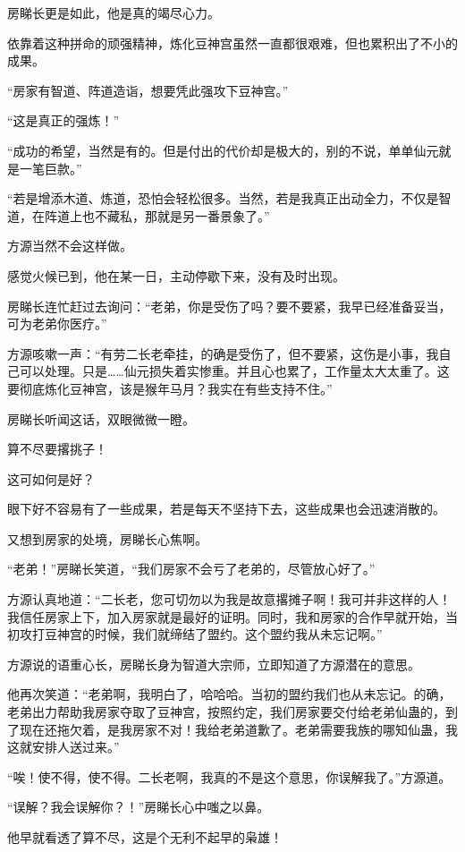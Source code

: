 \begin{this_body}
房睇长更是如此，他是真的竭尽心力。

依靠着这种拼命的顽强精神，炼化豆神宫虽然一直都很艰难，但也累积出了不小的成果。

“房家有智道、阵道造诣，想要凭此强攻下豆神宫。”

“这是真正的强炼！”

“成功的希望，当然是有的。但是付出的代价却是极大的，别的不说，单单仙元就是一笔巨款。”

“若是增添木道、炼道，恐怕会轻松很多。当然，若是我真正出动全力，不仅是智道，在阵道上也不藏私，那就是另一番景象了。”

方源当然不会这样做。

感觉火候已到，他在某一日，主动停歇下来，没有及时出现。

房睇长连忙赶过去询问：“老弟，你是受伤了吗？要不要紧，我早已经准备妥当，可为老弟你医疗。”

方源咳嗽一声：“有劳二长老牵挂，的确是受伤了，但不要紧，这伤是小事，我自己可以处理。只是……仙元损失着实惨重。并且心也累了，工作量太大太重了。这要彻底炼化豆神宫，该是猴年马月？我实在有些支持不住。”

房睇长听闻这话，双眼微微一瞪。

算不尽要撂挑子！

这可如何是好？

眼下好不容易有了一些成果，若是每天不坚持下去，这些成果也会迅速消散的。

又想到房家的处境，房睇长心焦啊。

“老弟！”房睇长笑道，“我们房家不会亏了老弟的，尽管放心好了。”

方源认真地道：“二长老，您可切勿以为我是故意撂摊子啊！我可并非这样的人！我信任房家上下，加入房家就是最好的证明。同时，我和房家的合作早就开始，当初攻打豆神宫的时候，我们就缔结了盟约。这个盟约我从未忘记啊。”

方源说的语重心长，房睇长身为智道大宗师，立即知道了方源潜在的意思。

他再次笑道：“老弟啊，我明白了，哈哈哈。当初的盟约我们也从未忘记。的确，老弟出力帮助我房家夺取了豆神宫，按照约定，我们房家要交付给老弟仙蛊的，到了现在还拖欠着，是我房家不对！我给老弟道歉了。老弟需要我族的哪知仙蛊，我这就安排人送过来。”

“唉！使不得，使不得。二长老啊，我真的不是这个意思，你误解我了。”方源道。

“误解？我会误解你？！”房睇长心中嗤之以鼻。

他早就看透了算不尽，这是个无利不起早的枭雄！


\end{this_body}
